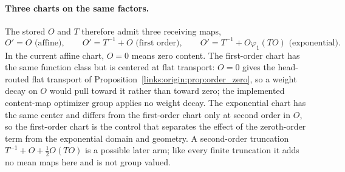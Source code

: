 \documentclass[11pt]{article}
\theoremstyle{definition}
\theoremstyle{remark}
\begin{document}
\paragraph{Three charts on the same factors.}
The stored $O$ and $T$ therefore admit three receiving maps,
\begin{equation}
O'=O\text{ (affine)},\qquad O'=T^{-1}+O\text{ (first order)},\qquad O'=T^{-1}+O\varphi_1(TO)\text{ (exponential)}.
\label{links:origin:eq:three_charts}
\end{equation}
In the current affine chart, $O=0$ means zero content. The first-order chart has the same function class but is centered at flat transport: $O=0$ gives the head-routed flat transport of Proposition~\ref{links:origin:prop:order_zero}, so a weight decay on $O$ would pull toward it rather than toward zero; the implemented content-map optimizer group applies no weight decay. The exponential chart has the same center and differs from the first-order chart only at second order in $O$, so the first-order chart is the control that separates the effect of the zeroth-order term from the exponential domain and geometry. A second-order truncation $T^{-1}+O+\tfrac12O(TO)$ is a possible later arm; like every finite truncation it adds no mean maps here and is not group valued.
\end{document}
